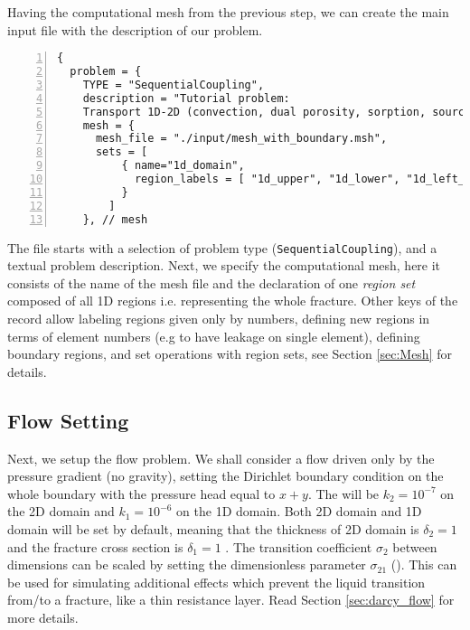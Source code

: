 Having the computational mesh from the previous step, we can create the main input file with the description of our problem. 
\begin{Verbatim}[numbers=left]
{
  problem = {
    TYPE = "SequentialCoupling", 
    description = "Tutorial problem: 
    Transport 1D-2D (convection, dual porosity, sorption, sources).", 
    mesh = {
      mesh_file = "./input/mesh_with_boundary.msh",
      sets = [
          { name="1d_domain", 
            region_labels = [ "1d_upper", "1d_lower", "1d_left_branch" ]
          }
        ]
    }, // mesh
\end{Verbatim}
The file starts with a selection of problem type (\verb'SequentialCoupling'), and a textual problem description.
Next, we specify the computational mesh, here it consists of the name of the mesh file and the declaration of one {\it region set} 
composed of all 1D regions i.e. representing the whole fracture. Other keys of the  record allow labeling regions given only by numbers, 
defining new regions in terms of element numbers (e.g to have leakage on single element), 
defining boundary regions, and set operations with region sets, see Section \ref{sec:Mesh} for details.

\subsection{Flow Setting}
Next, we setup the flow problem. We shall consider a flow driven only by the pressure gradient (no gravity),
setting the Dirichlet boundary condition on the whole boundary with the pressure head equal to $x+y$. 
The  will be $k_2=10^{-7}$  on the 2D domain and $k_1=10^{-6}$  on the 1D domain.
Both 2D domain and 1D domain  will be set by default,
meaning that the thickness of 2D domain is $\delta_2=1$  and the fracture cross section is $\delta_1=1$ .
The transition coefficient $\sigma_2$ between dimensions can be scaled by setting the dimensionless parameter 
$\sigma_{21}$ (). This can be used for simulating additional
effects which prevent the liquid transition from/to a fracture, like a thin resistance layer. Read Section 
\ref{sec:darcy_flow} for more details.

